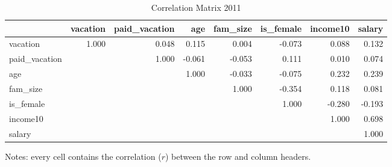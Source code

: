 \documentclass{article}
\begin{document}
    \begin{table}[h]
    \centering
    \hspace*{-1.5cm}
    \begin{tabular}{l|r|r|r|r|r|r|r}
                     & vacation & paid\_vacation &    age & fam\_size & is\_female & income10 & salary \\ \hline
      vacation       &    1.000 &          0.048 &  0.115 &     0.004 &     -0.073 &    0.088 &  0.132 \\ \hline
      paid\_vacation &          &          1.000 & -0.061 &    -0.053 &      0.111 &    0.010 &  0.074 \\ \hline
      age            &          &                &  1.000 &    -0.033 &     -0.075 &    0.232 &  0.239 \\ \hline
      fam\_size      &          &                &        &     1.000 &     -0.354 &    0.118 &  0.081 \\ \hline
      is\_female     &          &                &        &           &      1.000 &   -0.280 & -0.193 \\ \hline
      income10       &          &                &        &           &            &    1.000 &  0.698 \\ \hline
      salary         &          &                &        &           &            &          &  1.000
    \end{tabular}
    \hspace*{-1.5cm}
    \caption{Correlation Matrix 2011}
    \label{2011-correlation}
      Notes: every cell contains the correlation ($r$) between the row and column headers.
    \end{table}
\end{document}
